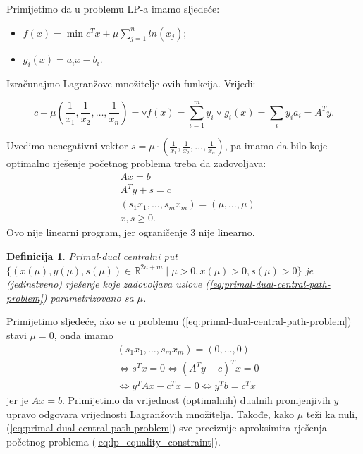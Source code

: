 \documentclass[a4paper, utf8, 11pt, colorlinks]{book}
\newtheorem{definition}{Definicija}
\begin{document}
Primijetimo da u problemu LP-a imamo sljedeće:
\begin{itemize}
	\item $f(x) = \min c^T x + \mu \sum_{j=1}^n ln(x_j) $;
	\item $g_i(x) = a_i x - b_i$.
\end{itemize}
Izračunajmo Lagranžove množitelje ovih funkcija. Vrijedi:

$$c + \mu (\frac{1}{x_1}, \frac{1}{x_2}, \ldots, \frac{1}{x_n}) = \triangledown f (x) =\sum_{i=1}^m y_i \triangledown g_i(x) = \sum_{i} y_i a_i = A^T y.$$ 

Uvedimo nenegativni vektor $s =\mu \cdot (\frac{1}{x_1}, \frac{1}{x_2}, \ldots, \frac{1}{x_n})$, pa imamo da bilo koje optimalno rješenje početnog problema treba da zadovoljava:
\begin{align}
	&A x = b \nonumber \\
	&A^T y + s = c  \nonumber \\
	& (s_1 x_1, \ldots, s_m x_m) = (\mu, \ldots, \mu) \label{eq:primal-dual-central-path-problem} \\
	& x, s \geq 0. \nonumber
\end{align}
Ovo nije linearni program, jer ograničenje 3 nije linearno.

\begin{definition}
	Primal-dual centralni put $\{(x(\mu), y(\mu), s(\mu)) \in \mathbb{R}^{2n + m} \mid \mu > 0, x(\mu) >0, s(\mu)>0 \}$ je (jedinstveno) rješenje koje zadovoljava uslove (\ref{eq:primal-dual-central-path-problem}) parametrizovano sa $\mu$. 
\end{definition}

Primijetimo sljedeće, ako se u problemu (\ref{eq:primal-dual-central-path-problem}) stavi $\mu = 0$, onda imamo 
\begin{align*}
	&(s_1 x_1, \ldots, s_m x_m) = (0, \ldots, 0) \\
	&\Longleftrightarrow s^T x = 0  \Longleftrightarrow (A^T y - c)^T x = 0 \\
	&\Longleftrightarrow y^T A x - c^T x = 0 \Longleftrightarrow y^T b = c^Tx
\end{align*}
jer je $Ax = b$. Primijetimo da   vrijednost (optimalnih) dualnih promjenjivih $y$ upravo odgovara vrijednosti Lagranžovih množitelja. Takođe, kako $\mu$ teži ka nuli,   (\ref{eq:primal-dual-central-path-problem}) sve preciznije aproksimira rješenja početnog problema (\ref{eq:lp_equality_constraint}). 
\end{document}
